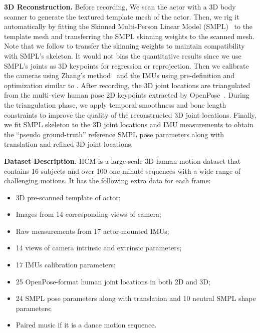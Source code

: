 \documentclass[letterpaper]{article} \usepackage{aaai23}  \usepackage{times}  \usepackage{helvet}  \usepackage{courier}  \usepackage[hyphens]{url}  \usepackage{graphicx} \urlstyle{rm} \def\UrlFont{\rm}  \usepackage{natbib}  \usepackage{caption} \frenchspacing  \setlength{\pdfpagewidth}{8.5in}  \setlength{\pdfpageheight}{11in}  \usepackage{algorithm}
\newcommand{\myparagraph}[1]{\vspace{0.1em}\noindent\textbf{#1}}
\begin{document}
\myparagraph{3D Reconstruction.}
Before recording, We scan the actor with a 3D body scanner to generate the textured template mesh of the actor. Then, we rig it automatically by fitting the Skinned Multi-Person Linear Model (SMPL)~\cite{SMPL2015} to the template mesh and transferring the SMPL skinning weights to the scanned mesh.
Note that we follow \cite{EventCap_CVPR2020, challencap} to transfer the skinning weights to maintain compatibility with SMPL's skeleton. It would not bias the quantitative results since we use SMPL's joints as 3D keypoints for regression or reprojection. 
Then we calibrate the cameras using Zhang's method~\cite{zhang2000flexible} and the IMUs using pre-definition and optimization similar to \cite{HybridFusion}.
After recording, the 3D joint locations are triangulated from the multi-view human pose 2D keypoints extracted by OpenPose~\cite{OpenPose}. 
During the triangulation phase, we apply temporal smoothness and bone length constraints to improve the quality of the reconstructed 3D joint locations.
Finally, we fit SMPL skeleton to the 3D joint locations and IMU measurements to obtain the ``pseudo ground-truth'' reference SMPL pose parameters along with translation and refined 3D joint locations.

\myparagraph{Dataset Description.}
HCM is a large-scale 3D human motion dataset that contains 16 subjects and over 100 one-minute sequences with a wide range of challenging motions. 
It has the following extra data for each frame:
\begin{itemize} 
\setlength\itemsep{0em}
    \item 3D pre-scanned template of actor;

	\item Images from 14 corresponding views of camera;

	\item Raw measurements from 17 actor-mounted IMUs;

	\item 14 views of camera intrinsic and extrinsic parameters;
	
	\item 17 IMUs calibration parameters;
	
	\item 25 OpenPose-format human joint locations in both 2D and 3D;
	
	\item 24 SMPL pose parameters along with translation and 10 neutral SMPL shape parameters;
	
	\item Paired music if it is a dance motion sequence.

\end{itemize} 
\end{document}
